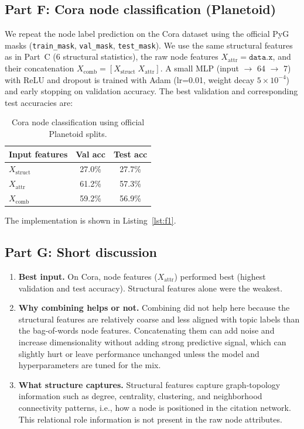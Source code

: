 \documentclass{article}
\begin{document}
\subsection{Part F: Cora node classification (Planetoid)}
We repeat the node label prediction on the Cora dataset using the official PyG masks (\texttt{train\_mask}, \texttt{val\_mask}, \texttt{test\_mask}). We use the same structural features as in Part~C (6 structural statistics), the raw node features $X_{\text{attr}}=\texttt{data.x}$, and their concatenation $X_{\text{comb}}=[X_{\text{struct}} \; X_{\text{attr}}]$. A small MLP (input $\rightarrow$ 64 $\rightarrow$ 7) with ReLU and dropout is trained with Adam (lr=0.01, weight decay $5\times10^{-4}$) and early stopping on validation accuracy. The best validation and corresponding test accuracies are:

\begin{table}[H]
    \centering
    \begin{tabular}{lcc}
        \hline
        Input features & Val acc & Test acc \\
        \hline
        $X_{\text{struct}}$ & 27.0\% & 27.7\% \\
        $X_{\text{attr}}$ & 61.2\% & 57.3\% \\
        $X_{\text{comb}}$ & 59.2\% & 56.9\% \\
        \hline
    \end{tabular}
    \caption{Cora node classification using official Planetoid splits.}
    \label{tab:cora_results}
\end{table}
The implementation is shown in Listing~\ref{lst:f1}.

\subsection{Part G: Short discussion}
\begin{enumerate}
    \item \textbf{Best input.} On Cora, node features ($X_{\text{attr}}$) performed best (highest validation and test accuracy). Structural features alone were the weakest.
    \item \textbf{Why combining helps or not.} Combining did not help here because the structural features are relatively coarse and less aligned with topic labels than the bag-of-words node features. Concatenating them can add noise and increase dimensionality without adding strong predictive signal, which can slightly hurt or leave performance unchanged unless the model and hyperparameters are tuned for the mix.
    \item \textbf{What structure captures.} Structural features capture graph-topology information such as degree, centrality, clustering, and neighborhood connectivity patterns, i.e., how a node is positioned in the citation network. This relational role information is not present in the raw node attributes.
\end{enumerate}
\end{document}
